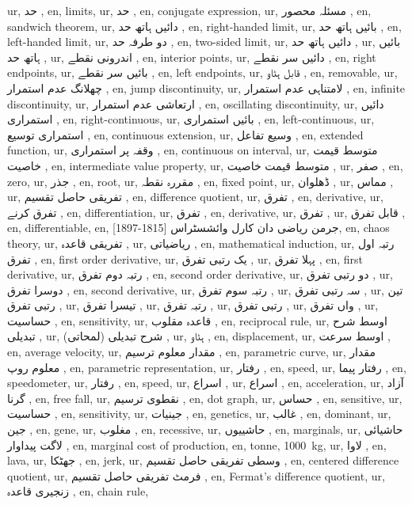 ur, حد ,
en, limits,
ur, حد ,
en, conjugate expression,
ur, مسئلہ محصور ,
en, sandwich theorem,
ur, دائیں ہاتھ حد ,
en, right-handed limit,
ur, بائیں ہاتھ حد ,
en, left-handed limit,
ur, دو طرفہ حد ,
en, two-sided limit,
ur, دائیں ہاتھ حد ,
ur, بائیں ہاتھ حد ,
ur, اندرونی نقطے ,
en, interior points,
ur, دائیں سر نقطے ,
en, right endpoints,
ur, بائیں سر نقطے ,
en, left endpoints,
ur, قابل ہٹاو ,
en, removable,
ur, چھلانگ عدم استمرار ,
en, jump discontinuity,
ur, لامتناہی عدم استمرار ,
en, infinite discontinuity,
ur, ارتعاشی عدم استمرار ,
en, oscillating discontinuity,
ur, دائیں استمراری ,
en, right-continuous,
ur, بائیں استمراری ,
en, left-continuous,
ur, استمراری توسیع ,
en, continuous extension,
ur, وسیع تفاعل ,
en, extended function,
ur, وقفہ پر استمراری ,
en, continuous on interval,
ur, متوسط قیمت خاصیت ,
en, intermediate value property,
ur, متوسط قیمت خاصیت ,
ur, صفر ,
en, zero,
ur, جذر ,
en, root,
ur, مقررہ نقطہ ,
en, fixed point,
ur, ڈھلوان ,
ur, مماس ,
ur, تفریقی حاصل تقسیم ,
en, difference quotient,
ur, تفرق ,
en, derivative,
ur, تفرق کرنے  ,
en, differentiation,
ur, تفرق ,
en, derivative,
ur, تفرق ,
ur, قابل تفرق ,
en, differentiable,
en, جرمن ریاضی دان کارل وائشسٹراس [1815-1897],
en, chaos theory,
ur, تفریقی قاعدہ ,
ur, ریاضیاتی ,
en, mathematical induction,
ur, رتبہ اول تفرق ,
en, first order derivative,
ur, یک رتبی تفرق ,
ur, پہلا تفرق ,
en, first derivative,
ur, رتبہ دوم تفرق ,
en, second order derivative,
ur, دو رتبی تفرق ,
ur, دوسرا تفرق ,
en, second derivative,
ur, رتبہ سوم تفرق ,
ur, سہ رتبی تفرق ,
ur, تین رتبی تفرق ,
ur, تیسرا تفرق ,
ur, رتبہ  تفرق ,
ur,  رتبی تفرق ,
ur,  واں تفرق ,
ur, حساسیت ,
en, sensitivity,
ur, قاعدہ مقلوب ,
en, reciprocal rule,
ur, اوسط شرح تبدیلی ,
ur, (لمحاتی) شرح تبدیلی ,
ur, ہٹاو ,
en, displacement,
ur, اوسط سرعت ,
en, average velocity,
ur, مقدار معلوم ترسیم ,
en, parametric curve,
ur, مقدار معلوم روپ ,
en, parametric representation,
ur, رفتار ,
en, speed,
ur, رفتار پیما  ,
en, speedometer,
ur, رفتار ,
en, speed,
ur, اسراع ,
ur, اسراع ,
en, acceleration,
ur, آزاد گرنا ,
en, free fall,
ur, نقطوی ترسیم ,
en, dot graph,
ur, حساس ,
en, sensitive,
ur, حساسیت ,
en, sensitivity,
ur, جینیات ,
en, genetics,
ur, غالب ,
en, dominant,
ur, جین ,
en, gene,
ur, مغلوب ,
en, recessive,
ur, حاشییوں ,
en, marginals,
ur, حاشیائی لاگت پیداوار ,
en, marginal cost of production,
en, tonne, \SI {1000}{\kilo \gram },
ur, لاوا  ,
en, lava,
ur, جھٹکا ,
en, jerk,
ur, وسطی تفریقی حاصل تقسیم ,
en, centered difference quotient,
ur, فرمٹ تفریقی حاصل تقسیم ,
en, Fermat's difference quotient,
ur, زنجیری قاعدہ ,
en, chain rule,
